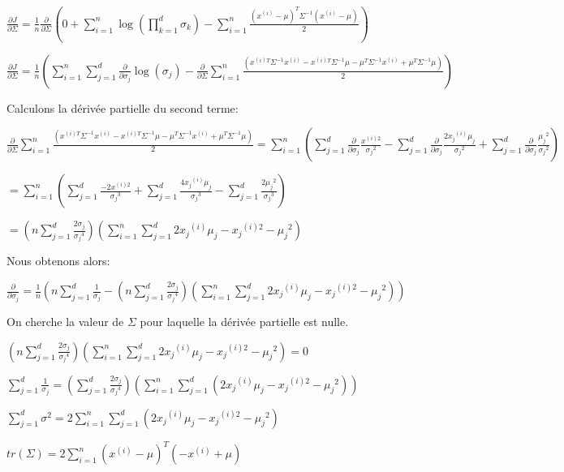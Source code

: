 \documentclass[a4paper,10pt]{article}
\begin{document}
$\frac{\partial J}{\partial \Sigma} = \frac{1}{n} \frac{\partial }{\partial \Sigma}(0 + \sum_{i=1}^{n} \log (\prod_{k = 1}^{d} \sigma_k) - \sum_{i=1}^{n} \frac{ (x^{(i)}- \mu)^{T} \Sigma^{-1} (x^{(i)}- \mu)}{2})$

$\frac{\partial J}{\partial \Sigma} = \frac{1}{n} (\sum_{i=1}^{n}  \sum_{j=1}^{d} \frac{\partial }{\partial \sigma_j} \log (\sigma_j) - \frac{\partial }{\partial \Sigma} \sum_{i=1}^{n} \frac{ (x^{(i)T} \Sigma^{-1} x^{(i)} - x^{(i)T} \Sigma^{-1} \mu - \mu^{T}\Sigma^{-1} x^{(i)} + \mu^{T}\Sigma^{-1}\mu)}{2})$

Calculons la dérivée partielle du second terme:

$\frac{\partial }{\partial \Sigma} \sum_{i=1}^{n} \frac{ (x^{(i)T} \Sigma^{-1} x^{(i)} - x^{(i)T} \Sigma^{-1} \mu - \mu^{T}\Sigma^{-1} x^{(i)} + \mu^{T}\Sigma^{-1}\mu)}{2} = \sum_{i=1}^{n} (\sum_{j=1}^{d} \frac{\partial }{\partial \sigma_j} \frac {x^{(i)2}}{{\sigma_j}^2} - \sum_{j=1}^{d} \frac{\partial }{\partial \sigma_j} \frac {2 {x_j}^{(i)} \mu_j}{{\sigma_j}^2} + \sum_{j=1}^{d} \frac{\partial }{\partial \sigma_j} \frac{{\mu_j}^2}{{\sigma_j}^2})$

$ {} = \sum_{i=1}^{n} (\sum_{j=1}^{d} \frac {-2x^{(i)2}}{{\sigma_j}^3} + \sum_{j=1}^{d} \frac {4 {x_j}^{(i)} \mu_j}{{\sigma_j}^3} - \sum_{j=1}^{d} \frac{2{\mu_j}^2}{{\sigma_j}^3})$

$ {} = (n \sum_{j=1}^{d} \frac{2 \sigma_j}{{\sigma_j}^4}) (\sum_{i=1}^{n} \sum_{j=1}^{d} 2 {x_j}^{(i)}  \mu_j - {x_j}^{(i)2} - {\mu_j}^2)$

Nous obtenons alors:

$\frac{\partial }{\partial \sigma_j} = \frac {1}{n} (n \sum_{j = 1}^{d} \frac{1}{\sigma_j} - (n \sum_{j=1}^{d} \frac{2 \sigma_j}{{\sigma_j}^4}) (\sum_{i=1}^{n} \sum_{j=1}^{d} 2 {x_j}^{(i)}  \mu_j - {x_j}^{(i)2} - {\mu_j}^2))$

On cherche la valeur de $\Sigma$ pour laquelle la dérivée partielle est nulle.

$(n \sum_{j=1}^{d} \frac{2 \sigma_j}{{\sigma_j}^4}) (\sum_{i=1}^{n} \sum_{j=1}^{d} 2 {x_j}^{(i)}  \mu_j - {x_j}^{(i)2} - {\mu_j}^2) = 0$

$ \sum_{j = 1}^{d} \frac{1}{\sigma_j}=  (\sum_{j=1}^{d} \frac{2 \sigma_j}{{\sigma_j}^4}) ( \sum_{i=1}^{n} \sum_{j=1}^{d} (2 {x_j}^{(i)}  \mu_j - {x_j}^{(i)2} - {\mu_j}^2) )$

$ \sum_{j = 1}^{d} \sigma^2 = 2 \sum_{i = 1}^{n} \sum_{j = 1}^{d} (2 {x_j}^{(i)}  \mu_j - {x_j}^{(i)2} - {\mu_j}^2)$

$tr(\Sigma) = 2 \sum_{i = 1}^{n} (x^{(i)} - \mu)^{T}(-x^{(i)}+\mu)$
\end{document}
